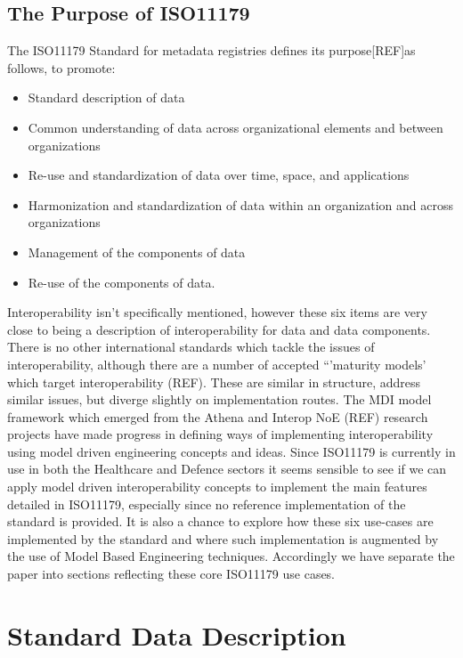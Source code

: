 \documentclass{llncs}
\begin{document}
\subsection{The Purpose of ISO11179}

The ISO11179 Standard for metadata registries defines its purpose[REF]as follows,
\newline
to promote:
\begin{itemize}
\item Standard description of data
\item Common understanding of data across organizational elements and between organizations
\item Re-use and standardization of data over time, space, and applications
\item Harmonization and standardization of data within an organization and across organizations
\item Management of the components of data
\item Re-use of the components of data.
\end{itemize}

Interoperability isn't specifically mentioned, however these six items are very close to being a description of interoperability for data and data components. There is no other international standards which tackle the issues of interoperability, although there are a number of accepted ``'maturity models' which target interoperability (REF). These are similar in structure, address similar issues, but diverge slightly on implementation routes. The MDI model framework which emerged from the Athena and Interop NoE (REF) research projects have made progress in defining ways of implementing interoperability using model driven engineering concepts and ideas. Since ISO11179 is currently in use in both the Healthcare and Defence sectors it seems sensible to see if we can apply model driven interoperability concepts to implement the main features detailed in ISO11179, especially since no reference implementation of the standard is provided. It is also a chance to explore how these six use-cases are implemented by the standard and where such implementation is augmented by the use of Model Based Engineering techniques. Accordingly we have separate the paper into sections reflecting these core ISO11179 use cases.



\section{Standard Data Description}
\end{document}
